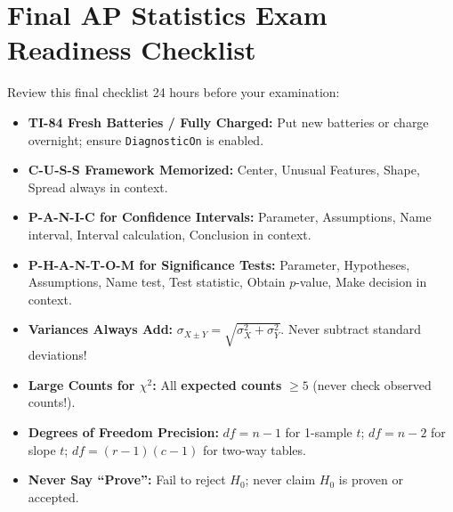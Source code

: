 \section*{Final AP Statistics Exam Readiness Checklist}
\begin{lessonbox}
Review this final checklist 24 hours before your examination:
\begin{itemize}[leftmargin=1.2em]
  \item[$\square$] \textbf{TI-84 Fresh Batteries / Fully Charged:} Put new batteries or charge overnight; ensure \texttt{DiagnosticOn} is enabled.
  \item[$\square$] \textbf{C-U-S-S Framework Memorized:} Center, Unusual Features, Shape, Spread always in context.
  \item[$\square$] \textbf{P-A-N-I-C for Confidence Intervals:} Parameter, Assumptions, Name interval, Interval calculation, Conclusion in context.
  \item[$\square$] \textbf{P-H-A-N-T-O-M for Significance Tests:} Parameter, Hypotheses, Assumptions, Name test, Test statistic, Obtain $p$-value, Make decision in context.
  \item[$\square$] \textbf{Variances Always Add:} $\sigma_{X \pm Y} = \sqrt{\sigma_X^2 + \sigma_Y^2}$. Never subtract standard deviations!
  \item[$\square$] \textbf{Large Counts for $\chi^2$:} All \textbf{expected counts} $\ge 5$ (never check observed counts!).
  \item[$\square$] \textbf{Degrees of Freedom Precision:} $df = n - 1$ for 1-sample $t$; $df = n - 2$ for slope $t$; $df = (r-1)(c-1)$ for two-way tables.
  \item[$\square$] \textbf{Never Say ``Prove'':} Fail to reject $H_0$; never claim $H_0$ is proven or accepted.
\end{itemize}
\end{lessonbox}
